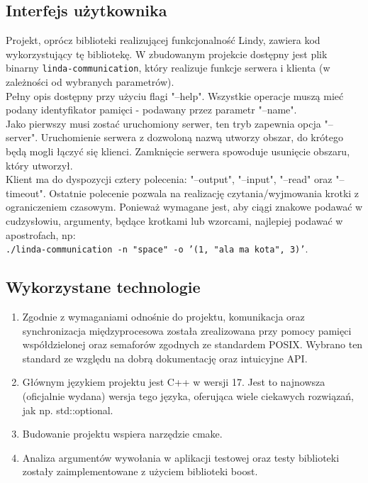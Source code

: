 \documentclass[a4paper]{article}
\begin{document}
	\subsection{Interfejs użytkownika}
	Projekt, oprócz biblioteki realizującej funkcjonalność Lindy, zawiera kod wykorzystujący tę bibliotekę. W zbudowanym projekcie dostępny jest plik binarny \texttt{linda-communication}, który realizuje funkcje serwera i klienta (w zależności od wybranych parametrów).
	\\
	Pełny opis dostępny przy użyciu flagi "--help". Wszystkie operacje muszą mieć podany identyfikator pamięci - podawany przez parametr "--name". \\
	
	Jako pierwszy musi zostać uruchomiony serwer, ten tryb zapewnia opcja "--server". Uruchomienie serwera z dozwoloną nazwą utworzy obszar, do krótego będą mogli łączyć się klienci. Zamknięcie serwera spowoduje usunięcie obszaru, który utworzył. \\
	
	Klient ma do dyspozycji cztery polecenia: "--output", "--input", "--read" oraz "--timeout". Ostatnie polecenie pozwala na realizację czytania/wyjmowania krotki z ograniczeniem czasowym. Ponieważ wymagane jest, aby ciągi znakowe podawać w cudzysłowiu, argumenty, będące krotkami lub wzorcami, najlepiej podawać w apostrofach, np:\\ \texttt{./linda-communication -n "space" -o '(1, "ala ma kota", 3)'}.
	
	\subsection{Wykorzystane technologie}
	\begin{enumerate}
		\item Zgodnie z wymaganiami odnośnie do projektu, komunikacja oraz synchronizacja międzyprocesowa została zrealizowana przy pomocy pamięci współdzielonej oraz semaforów zgodnych ze standardem POSIX. Wybrano ten standard ze względu na dobrą dokumentację oraz intuicyjne API.
		\item Głównym językiem projektu jest C++ w wersji 17. Jest to najnowsza (oficjalnie wydana) wersja tego języka, oferująca wiele ciekawych rozwiązań, jak np. std::optional.
		\item Budowanie projektu wspiera narzędzie cmake.
		\item Analiza argumentów wywołania w aplikacji testowej oraz testy biblioteki zostały zaimplementowane z użyciem biblioteki boost. 
	\end{enumerate}
	
\end{document}

